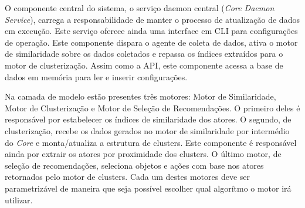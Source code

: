 \documentclass[
	12pt,				%
    oneside,			%
	a4paper,			%
	english,			%
	french,				%
	spanish,			%
	brazil,				%
	]{abntex2}
\begin{document}
O componente central do sistema, o serviço daemon central (\textit{Core Daemon Service}), carrega a responsabilidade de manter o processo de atualização de dados em execução. Este serviço oferece ainda uma interface em CLI para configurações
de operação. Este componente dispara o agente de coleta de dados, ativa o motor de similaridade sobre os dados coletados e repassa os índices extraídos para o motor de clusterização. Assim como a API, este componente acessa a base de dados
em memória para ler e inserir configurações.

Na camada de modelo estão presentes três motores: Motor de Similaridade, Motor de Clusterização e Motor de Seleção de Recomendações. O primeiro deles é responsável por estabelecer os índices de similaridade dos atores. O segundo, de 
clusterização, recebe os dados gerados no motor de similaridade por intermédio do \textit{Core} e monta/atualiza a estrutura de clusters. Este componente é responsável ainda por extrair os atores por proximidade dos clusters. O último
motor, de seleção de recomendações, seleciona objetos e ações com base nos atores retornados pelo motor de clusters. Cada um destes motores deve ser parametrizável de maneira que seja possível escolher qual algorítmo o motor irá utilizar.
\end{document}
